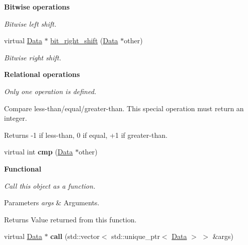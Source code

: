 \begin{Indent}{\bf Bitwise operations}
\begin{DoxyCompactItemize}
\begin{DoxyCompactList}\small\item\em Bitwise left shift. \end{DoxyCompactList}\item 
virtual \hyperlink{classcreek_1_1_data}{Data} $\ast$ \hyperlink{classcreek_1_1_data_ab66e43d3b232a3a483d9faa8a6c0c3b0}{bit\+\_\+right\+\_\+shift} (\hyperlink{classcreek_1_1_data}{Data} $\ast$other)\hypertarget{classcreek_1_1_data_ab66e43d3b232a3a483d9faa8a6c0c3b0}{}\label{classcreek_1_1_data_ab66e43d3b232a3a483d9faa8a6c0c3b0}

\begin{DoxyCompactList}\small\item\em Bitwise right shift. \end{DoxyCompactList}\end{DoxyCompactItemize}
\end{Indent}
\begin{Indent}{\bf Relational operations}\par
{\em Only one operation is defined.

Compare less-\/than/equal/greater-\/than. This special operation must return an integer. \begin{DoxyReturn}{Returns}
-\/1 if less-\/than, 0 if equal, +1 if greater-\/than. 
\end{DoxyReturn}
}\begin{DoxyCompactItemize}
\item 
virtual int {\bfseries cmp} (\hyperlink{classcreek_1_1_data}{Data} $\ast$other)\hypertarget{classcreek_1_1_data_a4ac406bda470a940731bbbf1d7ba6c93}{}\label{classcreek_1_1_data_a4ac406bda470a940731bbbf1d7ba6c93}

\end{DoxyCompactItemize}
\end{Indent}
\begin{Indent}{\bf Functional}\par
{\em Call this object as a function. 
\begin{DoxyParams}{Parameters}
{\em args} & Arguments. \\
\hline
\end{DoxyParams}
\begin{DoxyReturn}{Returns}
Value returned from this function. 
\end{DoxyReturn}
}\begin{DoxyCompactItemize}
\item 
virtual \hyperlink{classcreek_1_1_data}{Data} $\ast$ {\bfseries call} (std\+::vector$<$ std\+::unique\+\_\+ptr$<$ \hyperlink{classcreek_1_1_data}{Data} $>$ $>$ \&args)\hypertarget{classcreek_1_1_data_a237f456c2bcc38e5f6c5836c6a3b8d51}{}\label{classcreek_1_1_data_a237f456c2bcc38e5f6c5836c6a3b8d51}

\end{DoxyCompactItemize}
\end{Indent}
